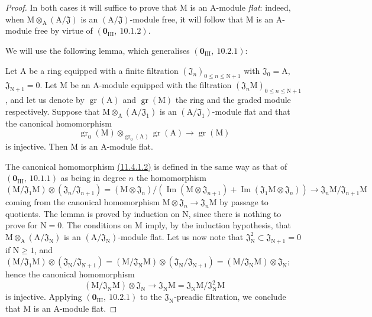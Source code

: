 \begin{proof}
In both cases it will suffice to prove that $\mathrm{M}$ is an $\mathrm{A}$-module \emph{flat}: indeed,
when $\mathrm{M}\otimes_\mathrm{A}(\mathrm{A}/\mathfrak{J})$ is an $(\mathrm{A}/\mathfrak{J})$-module free, it will follow that $\mathrm{M}$ is an $\mathrm{A}$-module
free by virtue of $(\mathbf{0}_{\mathrm{III}},~10.1.2)$.

We will use the following lemma, which generalises $(\mathbf{0}_{\mathrm{III}},~10.2.1)$:

\begin{lemma}[11.4.1.1]
\label{IV.11.4.1.1}
Let $\mathrm{A}$ be a ring equipped with a finite filtration $(\mathfrak{J}_n)_{0\leq n\leq\mathrm{N}+1}$ with
$\mathfrak{J}_0=\mathrm{A}$, $\mathfrak{J}_{\mathrm{N}+1}=0$. Let $\mathrm{M}$ be an $\mathrm{A}$-module equipped with the filtration $(\mathfrak{J}_n\mathrm{M})_{0\leq n\leq\mathrm{N}+1}$, and let us denote
by $\operatorname{gr}(\mathrm{A})$ and $\operatorname{gr}(\mathrm{M})$ the ring and the graded module respectively. Suppose that $\mathrm{M}\otimes_\mathrm{A}(\mathrm{A}/\mathfrak{J}_1)$
is an $(\mathrm{A}/\mathfrak{J}_1)$-module flat and that the canonical homomorphism
\[
\label{IV.11.4.1.2}
\operatorname{gr}_0(\mathrm{M})\otimes_{\operatorname{gr}_0(\mathrm{A})}\operatorname{gr}(\mathrm{A}) \to \operatorname{gr}(\mathrm{M})
\tag{11.4.1.2}
\]
is injective. Then $\mathrm{M}$ is an $\mathrm{A}$-module flat.
\end{lemma}

The canonical homomorphism {\hyperref[IV.11.4.1.2]{(11.4.1.2)}} is defined in the same way as that
of $(\mathbf{0}_{\mathrm{III}},~10.1.1)$ as being in degree $n$ the homomorphism
\[
(\mathrm{M}/\mathfrak{J}_1\mathrm{M})\otimes(\mathfrak{J}_n/\mathfrak{J}_{n+1})=(\mathrm{M}\otimes\mathfrak{J}_n)/(\operatorname{Im}(\mathrm{M}\otimes\mathfrak{J}_{n+1})+\operatorname{Im}(\mathfrak{J}_1\mathrm{M}\otimes\mathfrak{J}_n))\to\mathfrak{J}_n\mathrm{M}/\mathfrak{J}_{n+1}\mathrm{M}
\]
coming from the canonical homomorphism $\mathrm{M}\otimes\mathfrak{J}_n\to\mathfrak{J}_n\mathrm{M}$ by passage to quotients.
The lemma is proved by induction on $\mathrm{N}$, since there is nothing to prove for $\mathrm{N}=0$.
The conditions on $\mathrm{M}$ imply, by the induction hypothesis, that $\mathrm{M}\otimes_\mathrm{A}(\mathrm{A}/\mathfrak{J}_\mathrm{N})$
is an $(\mathrm{A}/\mathfrak{J}_\mathrm{N})$-module flat. Let us now note that $\mathfrak{J}_\mathrm{N}^2\subset\mathfrak{J}_{\mathrm{N}+1}=0$ if $\mathrm{N}\geq 1$, and
$(\mathrm{M}/\mathfrak{J}_1\mathrm{M})\otimes(\mathfrak{J}_\mathrm{N}/\mathfrak{J}_{\mathrm{N}+1})=(\mathrm{M}/\mathfrak{J}_\mathrm{N}\mathrm{M})\otimes(\mathfrak{J}_\mathrm{N}/\mathfrak{J}_{\mathrm{N}+1})=(\mathrm{M}/\mathfrak{J}_\mathrm{N}\mathrm{M})\otimes\mathfrak{J}_\mathrm{N}$; hence the canonical homomorphism
\[
(\mathrm{M}/\mathfrak{J}_\mathrm{N}\mathrm{M})\otimes\mathfrak{J}_\mathrm{N} \to \mathfrak{J}_\mathrm{N}\mathrm{M}=\mathfrak{J}_\mathrm{N}\mathrm{M}/\mathfrak{J}_\mathrm{N}^2\mathrm{M}
\]
is injective. Applying $(\mathbf{0}_{\mathrm{III}},~10.2.1)$ to the $\mathfrak{J}_\mathrm{N}$-preadic filtration, we conclude that
$\mathrm{M}$ is an $\mathrm{A}$-module flat.


\end{proof}
